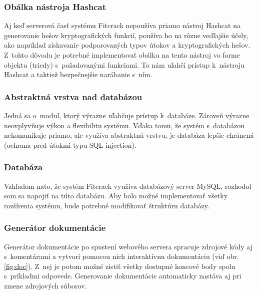 \documentclass[slovak,cprint]{fitthesis} %
\begin{document}
\subsubsection{Obálka nástroja Hashcat}
Aj keď serverová časť systému Fitcrack nepoužíva priamo nástroj Hashcat na generovanie hešov kryptografických funkcií, používa ho na rôzne vedľajšie účely, ako napríklad získavanie podporovaných typov útokov a kryptografických hešov. Z~tohto dôvodu je potrebné implementovať obálku na tento nástroj vo forme objektu (triedy) s~požadovanými funkciami. To nám uľahčí prístup k~nástroju Hashcat a taktiež bezpečnejšie narábanie s~ním.

\subsubsection{Abstraktná vrstva nad databázou}
Jedná sa o~modul, ktorý výrazne uľahčuje prístup k~databáze. Zároveň výrazne neovplyvňuje výkon a flexibilitu systému. Vďaka tomu, že systém s~databázou nekomunikuje priamo, ale využíva abstraktnú vrstvu, je databáza lepšie chránená (ochrana pred útokmi typu SQL injection).


\subsubsection{Databáza}
Vzhľadom nato, že systém Fitcrack využíva databázový server MySQL, rozhodol som sa napojiť na túto databázu. Aby bolo možné implementovať všetky rozšírenia systému, bude potrebné modifikovať štruktúru databázy.


\subsubsection{Generátor dokumentácie}
Generátor dokumentácie po spustení webového servera spracuje zdrojové kódy aj s~komentárami a vytvorí pomocou nich interaktívnu dokumentáciu (viď obr. \ref{fig:doc}). Z~nej je potom možné zistiť všetky dostupné koncové body spolu s~príkladmi odpovede. Generovanie dokumentácie automaticky nastáva aj pri zmene zdrojových súborov.
\end{document}

